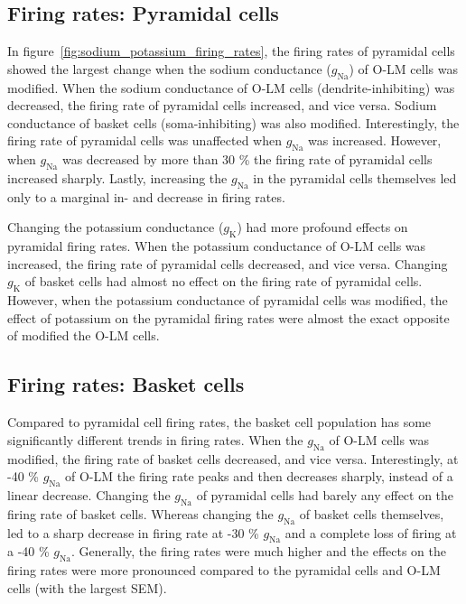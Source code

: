 \subsection{Firing rates: Pyramidal cells}
In figure~\ref{fig:sodium_potassium_firing_rates}, the firing rates of pyramidal cells showed the largest change when the sodium conductance (\(g_{\text{Na}}\)) of O-LM cells was modified.
When the sodium conductance of O-LM cells (dendrite-inhibiting) was decreased, the firing rate of pyramidal cells increased, and vice versa.
Sodium conductance of basket cells (soma-inhibiting) was also modified. Interestingly, the firing rate of pyramidal cells was unaffected when \(g_{\text{Na}}\) was increased.
However, when \(g_{\text{Na}}\) was decreased by more than 30 \% the firing rate of pyramidal cells increased sharply.
Lastly, increasing the \(g_{\text{Na}}\) in the pyramidal cells themselves led only to a marginal in- and decrease in firing rates.

Changing the potassium conductance (\(g_{\text{K}}\)) had more profound effects on pyramidal firing rates.
When the potassium conductance of O-LM cells was increased, the firing rate of pyramidal cells decreased, and vice versa.
Changing \(g_{\text{K}}\) of basket cells had almost no effect on the firing rate of pyramidal cells.
However, when the potassium conductance of pyramidal cells was modified, the effect of potassium on the pyramidal firing rates were almost the exact opposite of modified the O-LM cells.

\subsection{Firing rates: Basket cells}
Compared to pyramidal cell firing rates, the basket cell population has some significantly different trends in firing rates.
When the \(g_{\text{Na}}\) of O-LM cells was modified, the firing rate of basket cells decreased, and vice versa.
Interestingly, at -40 \% \(g_{\text{Na}}\) of O-LM the firing rate peaks and then decreases sharply, instead of a linear decrease.
Changing the \(g_{\text{Na}}\) of pyramidal cells had barely any effect on the firing rate of basket cells.
Whereas changing the \(g_{\text{Na}}\) of basket cells themselves, led to a sharp decrease in firing rate at -30 \% \(g_{\text{Na}}\) and a complete loss of firing at a -40 \%  \(g_{\text{Na}}\).
Generally, the firing rates were much higher and the effects on the firing rates were more pronounced compared to the pyramidal cells and O-LM cells (with the largest SEM).

